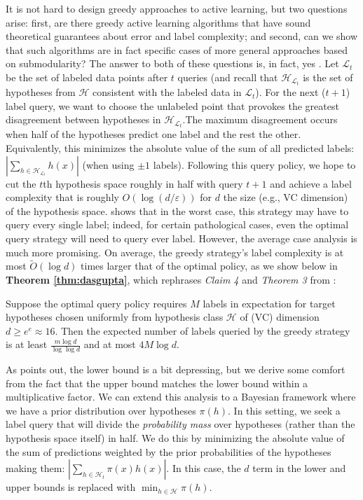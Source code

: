 It is not hard to design greedy approaches to active learning, but two questions arise: first, are there greedy active learning algorithms that have sound theoretical guarantees about error and label complexity; and second, can we show that such algorithms are in fact specific cases of more general approaches based on submodularity? The answer to both of these questions is, in fact, yes \cite{Dasgupta:2004}. Let $\mathcal{L}_t$ be the set of labeled data points after $t$ queries (and recall that $\mathcal{H}_{\mathcal{L}_t}$ is the set of hypotheses from $\mathcal{H}$ consistent with the labeled data in $\mathcal{L}_t$). For the next ($t+1$) label query, we want to choose the unlabeled point that provokes the greatest disagreement between hypotheses in $\mathcal{H}_{\mathcal{L}_t}$.The maximum disagreement occurs when half of the hypotheses predict one label and the rest the other. Equivalently, this minimizes the absolute value of the sum of all predicted labels: $| \sum_{h \in \mathcal{H}_{\mathcal{L}_t}} h(x)|$ (when using $\pm1$ labels). Following this query policy, we hope to cut the $t$th hypothesis space roughly in half with query $t+1$ and achieve a label complexity that is roughly $O(\log (d/\varepsilon))$ for $d$ the size (e.g., VC dimension) of the hypothesis space. \cite{Dasgupta:2004} shows that in the worst case, this strategy may have to query every single label; indeed, for certain pathological cases, even the optimal query strategy will need to query ever label. However, the average case analysis is much more promising. On average, the greedy strategy's label complexity is at most $\widetilde{O}(\log d)$ times larger that of the optimal policy, as we show below in \textbf{Theorem \ref{thm:dasgupta}}, which rephrases \textit{Claim 4} and \textit{Theorem 3} from \cite{Dasgupta:2004}:\\

\begin{theorem}
\label{thm:dasgupta}
Suppose the optimal query policy requires $M$ labels in expectation for target hypotheses chosen uniformly from hypothesis class $\mathcal{H}$ of (VC) dimension $d \geq e^e \approx 16$. Then the expected number of labels queried by the greedy strategy is at least $\frac{m \log d}{\log \log d}$ and at most $4 M \log d$.
\end{theorem}

As \cite{Dasgupta:2004} points out, the lower bound is a bit depressing, but we derive some comfort from the fact that the upper bound matches the lower bound within a multiplicative factor. We can extend this analysis to a Bayesian framework where we have a prior distribution over hypotheses $\pi(h)$. In this setting, we seek a label query that will divide the \textit{probability mass} over hypotheses (rather than the hypothesis space itself) in half. We do this by minimizing the absolute value of the sum of predictions weighted by the prior probabilities of the hypotheses making them: $| \sum_{h \in \mathcal{H}_t} \pi(x) h(x)|$. In this case, the $d$ term in the lower and upper bounds is replaced with $\min_{h \in \mathcal{H}} \pi(h)$.

